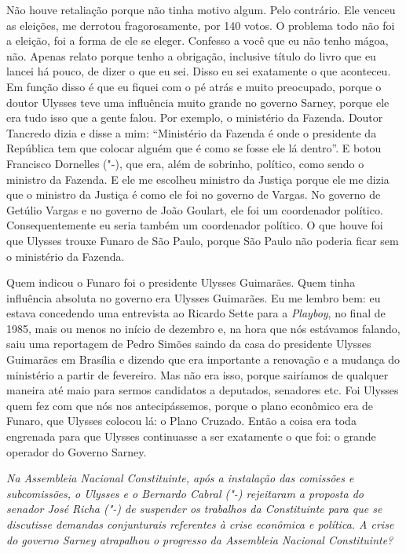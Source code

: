 Não houve retaliação porque não tinha motivo algum. Pelo
contrário. Ele venceu as eleições, me derrotou fragorosamente, por 140
votos. O problema todo não foi a eleição, foi a forma de ele se eleger.
Confesso a você que eu não tenho mágoa, não. Apenas relato porque tenho
a obrigação, inclusive título do livro que eu lancei há pouco, de dizer
o que eu sei. Disso eu sei exatamente o que aconteceu. Em função disso é
que eu fiquei com o pé atrás e muito preocupado, porque o doutor Ulysses
teve uma influência muito grande no governo Sarney, porque ele era tudo
isso que a gente falou. Por exemplo, o ministério da Fazenda. Doutor
Tancredo dizia e disse a mim: ``Ministério da Fazenda é onde o
presidente da República tem que colocar alguém que é como se fosse ele
lá dentro''. E botou Francisco Dornelles ("-), que era, além de
sobrinho, político, como sendo o ministro da Fazenda. E ele me escolheu
ministro da Justiça porque ele me dizia que o ministro da Justiça é
como ele foi no governo de Vargas. No governo de Getúlio Vargas e no
governo de João Goulart, ele foi um coordenador político.
Consequentemente eu seria também um coordenador político. O que houve
foi que Ulysses trouxe Funaro de São Paulo, porque São Paulo não poderia
ficar sem o ministério da Fazenda.

Quem indicou o Funaro foi o presidente Ulysses Guimarães. Quem tinha
influência absoluta no governo era Ulysses Guimarães. Eu me lembro bem:
eu estava concedendo uma entrevista ao Ricardo Sette para a \emph{Playboy}, no
final de 1985, mais ou menos no início de dezembro e, na hora que nós
estávamos falando, saiu uma reportagem de Pedro Simões saindo da casa do
presidente Ulysses Guimarães em Brasília e dizendo que era importante a
renovação e a mudança do ministério a partir de fevereiro. Mas não era
isso, porque sairíamos de qualquer maneira até maio para sermos
candidatos a deputados, senadores etc. Foi Ulysses quem fez com que nós
nos antecipássemos, porque o plano econômico era de Funaro, que Ulysses
colocou lá: o Plano Cruzado. Então a coisa era toda engrenada para que
Ulysses continuasse a ser exatamente o que foi: o grande operador do
Governo Sarney.

\medskip

\noindent\emph{Na Assembleia Nacional Constituinte, após a instalação das
comissões e subcomissões, o Ulysses e o Bernardo Cabral ("-)
rejeitaram a proposta do senador José Richa ("-) de suspender os
trabalhos da Constituinte para que se discutisse demandas conjunturais
referentes à crise econômica e política. A crise do governo Sarney
atrapalhou o progresso da Assembleia Nacional Constituinte?}

